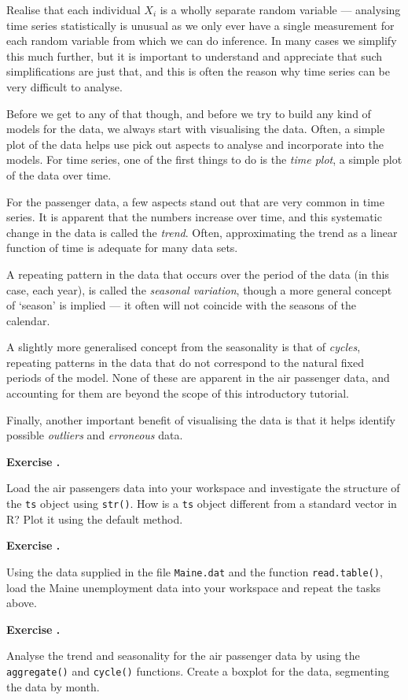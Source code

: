 \documentclass[10pt, a4paper]{article}
\newcounter{wssection}
\newcounter{wsexercise}[wssection]
\newcommand{\worksheetexercise}{
\stepcounter{wsexercise}
\vspace{5mm} \noindent \textbf{Exercise \thewssection.\thewsexercise \;}
}
\begin{document}
Realise that each individual $X_i$ is a wholly separate random
variable --- analysing time series statistically is unusual as we only
ever have a single measurement for each random variable from which we
can do inference. In many cases we simplify this much further, but it
is important to understand and appreciate that such simplifications
are just that, and this is often the reason why time series can be
very difficult to analyse.

Before we get to any of that though, and before we try to build any
kind of models for the data, we always start with visualising the
data. Often, a simple plot of the data helps use pick out aspects to
analyse and incorporate into the models. For time series, one of the
first things to do is the \emph{time plot}, a simple plot of the data
over time.

For the passenger data, a few aspects stand out that are very common
in time series. It is apparent that the numbers increase over time,
and this systematic change in the data is called the
\emph{trend}. Often, approximating the trend as a linear function of
time is adequate for many data sets.

A repeating pattern in the data that occurs over the period of the
data (in this case, each year), is called the
\emph{seasonal variation}, though a more general concept of `season'
is implied --- it often will not coincide with the seasons of the
calendar.

A slightly more generalised concept from the seasonality is that of
\emph{cycles}, repeating patterns in the data that do not correspond
to the natural fixed periods of the model. None of these are apparent
in the air passenger data, and accounting for them are beyond the
scope of this introductory tutorial.

Finally, another important benefit of visualising the data is that it
helps identify possible \emph{outliers} and \emph{erroneous} data.


\worksheetexercise
Load the air passengers data into your workspace and investigate the
structure of the \texttt{ts} object using \texttt{str()}. How is a
\texttt{ts} object different from a standard vector in R? Plot it
using the default  method.

\worksheetexercise
Using the data supplied in the file \texttt{Maine.dat} and the
function \texttt{read.table()}, load the Maine unemployment data into
your workspace and repeat the tasks above.

\worksheetexercise
Analyse the trend and seasonality for the air passenger data by using
the \texttt{aggregate()} and \texttt{cycle()} functions. Create a
boxplot for the data, segmenting the data by month.
\end{document}
